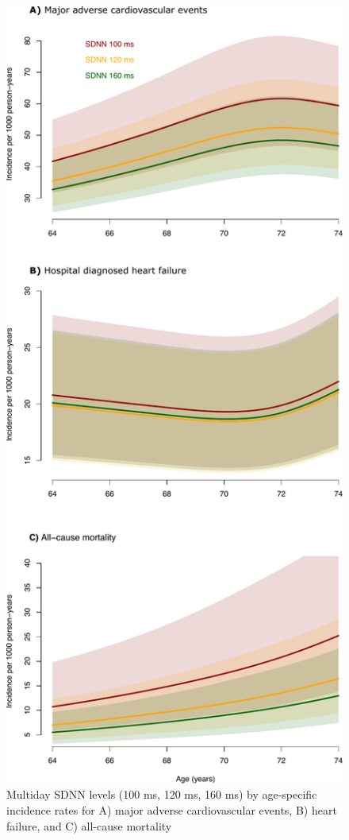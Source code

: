 \documentclass[
  a4paper,
  headsepline=true,
  open=any]{scrbook}
\begin{document}
\begin{figure}

{\centering \includegraphics{images/addition_pro_hrv_ir_mace.pdf}

}

\caption{\label{fig-addprohrv}Multiday SDNN levels (100 ms, 120 ms, 160
ms) by age-specific incidence rates for A) major adverse cardiovascular
events, B) heart failure, and C) all-cause mortality}

\end{figure}
\end{document}
